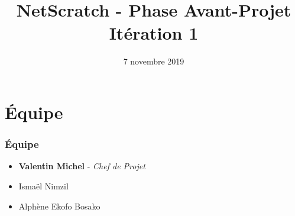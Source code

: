 \documentclass[9pt]{beamer}
\begin{document}
\title[NetScratch]{NetScratch - Phase Avant-Projet \\ Itération 1}
\date{7 novembre 2019}

\begin{frame}
    \titlepage
\end{frame}

\frame{\tableofcontents}

\section{Équipe}
\begin{frame}
    \frametitle{Équipe}
    \begin{center}
        \begin{itemize}
            \item{\textbf{Valentin Michel} - \textit{Chef de Projet}}
            \item{Ismaël Nimzil}
            \item{Alphène Ekofo Bosako}
        \end{itemize}
    \end{center}
\end{frame}
\end{document}
